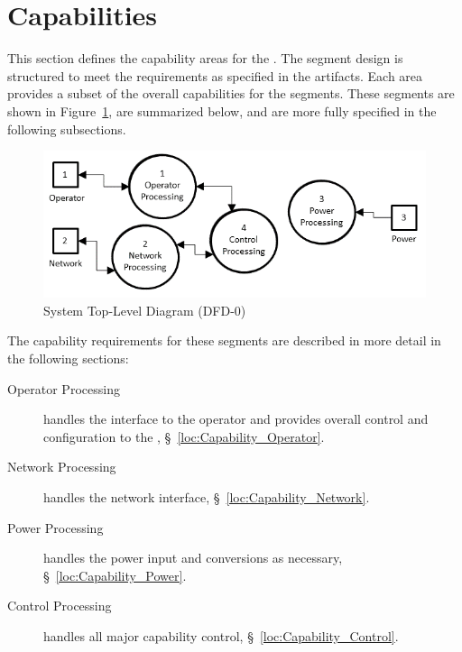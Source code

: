 \KNEADSECTIONNEWPAGE
\section{Capabilities}
\label{lab:sec_Capabilities}
% 


This section defines the capability areas for the \ThisSys.
The segment design is structured to meet the requirements as specified in the \TBD artifacts.
Each area provides a subset of the overall capabilities for the \ThisSys segments.
These segments are shown in Figure~\ref{fig:DFD-0}, are summarized below, and are more fully specified in the following subsections.
\begin{figure}[htbp]
	\centering
		\includegraphics[width=6.5in]{../zProjectWideData/images/DFD-0.png}
	\caption[System Top-Level Diagram]{System Top-Level Diagram (DFD-0)}
	\label{fig:DFD-0}
\end{figure}
 
The capability requirements for these segments are described in more detail in the following sections:
\begin{description}
	\item[Operator Processing] handles the \HMI interface to the operator and provides overall control and configuration to the \ThisSys, \S~\ref{loc:Capability_Operator}.
	\item[Network Processing] handles the network interface, \S~\ref{loc:Capability_Network}.
	\item[Power Processing] handles the power input and conversions as necessary, \S~\ref{loc:Capability_Power}.
	\item[Control Processing] handles all major capability control, \S~\ref{loc:Capability_Control}.
\end{description}

\newpage
